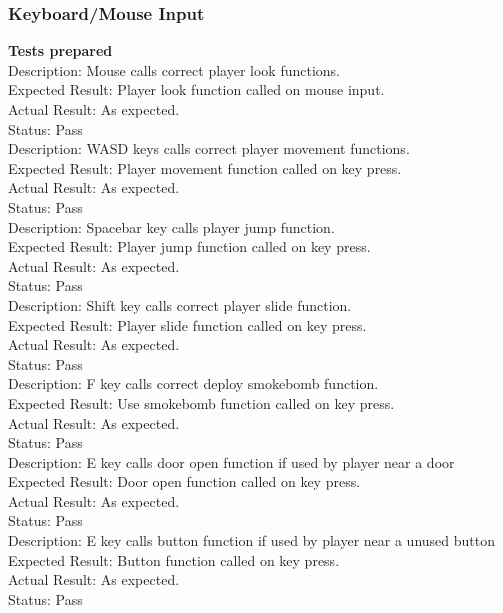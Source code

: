 \documentclass[11pt,a4paper]{article}
\begin{document}
\subsubsection{Keyboard/Mouse Input}
\textbf{Tests prepared} \\
Description: Mouse calls correct player look functions.\\
Expected Result: Player look function called on mouse input.\\
Actual Result: As expected.\\
Status: Pass
\smallskip\\
Description: WASD keys calls correct player movement functions.\\
Expected Result: Player movement function called on key press.\\
Actual Result: As expected.\\
Status: Pass
\smallskip\\
Description: Spacebar key calls player jump function.\\
Expected Result: Player jump function called on key press.\\
Actual Result: As expected.\\
Status: Pass
\smallskip\\
Description: Shift key calls correct player slide function.\\
Expected Result: Player slide function called on key press.\\
Actual Result: As expected.\\
Status: Pass
\smallskip\\
Description: F key calls correct deploy smokebomb function.\\
Expected Result: Use smokebomb function called on key press.\\
Actual Result: As expected.\\
Status: Pass
\smallskip\\
Description: E key calls door open function if used by player near a door\\
Expected Result: Door open function called on key press.\\
Actual Result: As expected.\\
Status: Pass
\smallskip\\
Description: E key calls button function if used by player near a unused button\\
Expected Result: Button function called on key press.\\
Actual Result: As expected.\\
Status: Pass
\end{document}
